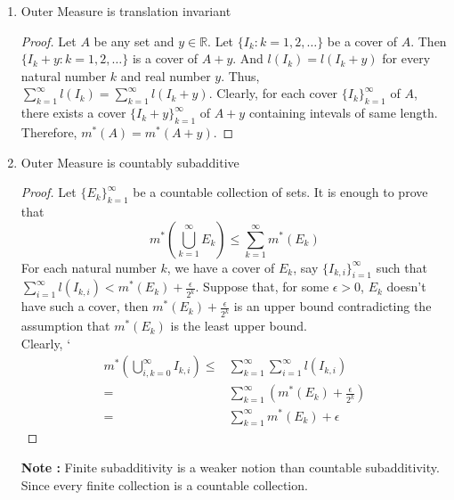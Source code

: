 \begin{enumerate}
\begin{proof}
	By monotonicity of Lebesgue outer measure, we have $m^\ast(J_1) \le m^\ast(I) \le m^\ast(J_2)$.
	However $m^\ast(J_1) = l(I)-\epsilon$ and $m^\ast(J_2) = l(I)+\epsilon$.
	Thus, $l(I)-\epsilon \le m^\ast(I) \le l(I)+\epsilon$.
	Therefore, $m^\ast(I) = l(I)$.

	\textbf{Case 3 : Unbounded Interval}
	Let $I$ be an unbounded interval.
	Then for any natural number $n$, there exists a closed bounded interval $J$ such that $J \subset I$ and $l(J) = n$.
	And $n = m^\ast(J) \le m^\ast(I),\ \forall n \in \mathbb{N}$.
	Therefore, $m^\ast(I) = \infty = l(I)$. 
	\end{proof}
	\item Outer Measure is translation invariant
	\begin{proof}
	Let $A$ be any set and $y \in \mathbb{R}$.
	Let $\{ I_k : k = 1,2,\dots \}$ be a cover of $A$.
	Then $\{ I_k+y : k = 1,2,\dots \}$ is a cover of $A+y$.
	And $l(I_k) = l(I_k+y)$ for every natural number $k$ and real number $y$.
	Thus, $\displaystyle \sum_{k=1}^\infty l(I_k) = \sum_{k=1}^\infty l(I_k+y)$.
	Clearly, for each cover $\{I_k\}_{k=1}^\infty$ of $A$, there exists a cover $\{ I_k+y \}_{k=1}^\infty$ of $A+y$ containing intevals of same length.
	Therefore, $m^\ast(A) = m^\ast(A+y)$.
	\end{proof}
	\item Outer Measure is countably subadditive
	\begin{proof}
	Let $\{E_k\}_{k=1}^\infty$ be a countable collection of sets.
	It is enough to prove that
		\begin{equation}
			m^\ast \left( \bigcup_{k=1}^\infty E_k \right) \le \sum_{k=1}^\infty m^\ast(E_k)
		\end{equation}
		For each natural number $k$, we have a cover of $E_k$, say $\{ I_{k,i} \}_{i = 1}^\infty$ such that $\displaystyle \sum_{i=1}^\infty l(I_{k,i}) < m^\ast(E_k) + \frac{\epsilon}{2^k}$.
		Suppose that, for some $\epsilon > 0$, $E_k$ doesn't have such a cover, then $m^\ast(E_k) + \frac{\epsilon}{2^k}$ is an upper bound contradicting the assumption that $m^\ast(E_k)$ is the least upper bound.\\

	Clearly,
`	\begin{align*}
	m^\ast \left( \bigcup_{i,k = 0}^\infty I_{k,i} \right)
	\le & \sum_{k=1}^\infty \sum_{i=1}^\infty l(I_{k,i}) \\
	= & \sum_{k=1}^\infty \left( m^\ast(E_k) + \frac{\epsilon}{2^k} \right) \\
	= & \sum_{k=1}^\infty  m^\ast(E_k) + \epsilon
	\end{align*}
\end{proof}
	\textbf{Note : } Finite subadditivity is a weaker notion than countable subadditivity.
	Since every finite collection is a countable collection.
\end{enumerate}

